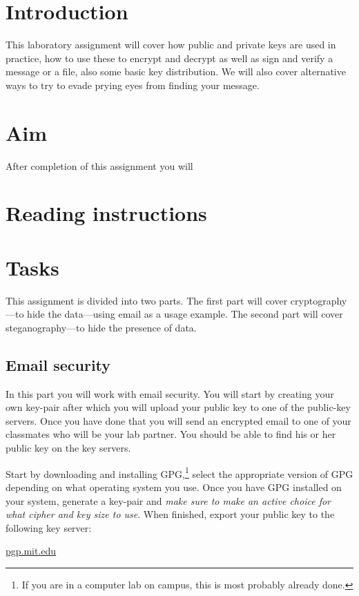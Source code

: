 \mode*

\section{Introduction}%
\label{Introduction}

This laboratory assignment will cover how public and private keys are used in 
practice, how to use these to encrypt and decrypt as well as sign and verify 
a message or a file, also some basic key distribution.
We will also cover alternative ways to try to evade prying eyes from finding
your message.


\section{Aim}%
\label{sec:Aim}

After completion of this assignment you will
\begin{itemize}
  
\end{itemize}


\section{Reading instructions}%
\label{sec:Reading}




\section{Tasks}%
\label{sec:Tasks}

This assignment is divided into two parts.
The first part will cover cryptography---to hide the data---using email as 
a usage example.
The second part will cover steganography---to hide the presence of data.

\subsection{Email security}%
\label{subsec:Email}

In this part you will work with email security.
You will start by creating your own key-pair after which you will upload your 
public key to one of the public-key servers.
Once you have done that you will send an encrypted email to one of your
classmates who will be your lab partner.
You should be able to find his or her public key on the key servers.

Start by downloading and installing \ac{GPG},\footnote{%
  If you are in a computer lab on campus, this is most probably already done.
} select the appropriate version of \ac{GPG} depending on what operating system 
you use.
Once you have \ac{GPG} installed on your system, generate a key-pair and 
\emph{make sure to make an active choice for what cipher and key size to use}.
When finished, export your public key to the following key server:
\begin{center}
  \url{pgp.mit.edu}
\end{center}

